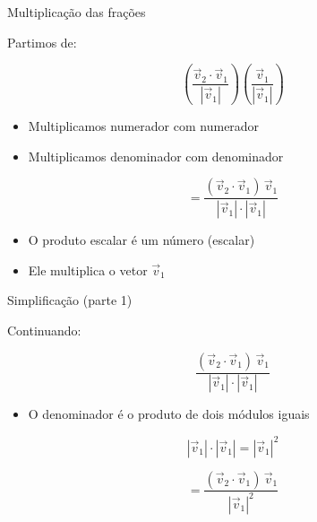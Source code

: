 \documentclass{beamer}
\begin{document}
\begin{frame}{Multiplicação das frações}


\vspace{0.5cm}

Partimos de:

\[
\left(\frac{\vec{v}_2 \cdot \vec{v}_1}{|\vec{v}_1|}\right)
\left(\frac{\vec{v}_1}{|\vec{v}_1|}\right)
\]

\vspace{0.5cm}

\begin{itemize}
    \item Multiplicamos numerador com numerador
    \item Multiplicamos denominador com denominador
\end{itemize}

\vspace{0.5cm}

\[
=
\frac{(\vec{v}_2 \cdot \vec{v}_1)\,\vec{v}_1}{|\vec{v}_1|\cdot|\vec{v}_1|}
\]

\vspace{0.5cm}

\begin{itemize}
    \item O produto escalar é um número (escalar)
    \item Ele multiplica o vetor $\vec{v}_1$
\end{itemize}

\end{frame}
\begin{frame}{Simplificação (parte 1)}


\vspace{0.5cm}

Continuando:

\[
\frac{(\vec{v}_2 \cdot \vec{v}_1)\,\vec{v}_1}{|\vec{v}_1|\cdot|\vec{v}_1|}
\]

\vspace{0.5cm}

\begin{itemize}
    \item O denominador é o produto de dois módulos iguais
\end{itemize}

\vspace{0.3cm}

\[
|\vec{v}_1|\cdot|\vec{v}_1| = |\vec{v}_1|^2
\]

\vspace{0.5cm}

\[
=
\frac{(\vec{v}_2 \cdot \vec{v}_1)\,\vec{v}_1}{|\vec{v}_1|^2}
\]

\end{frame}
\end{document}
